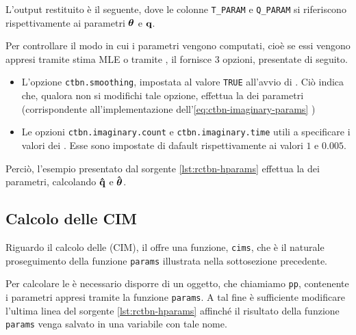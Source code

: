 L'output restituito è il seguente, dove le colonne \lstinline$T_PARAM$ e \lstinline$Q_PARAM$ si riferiscono rispettivamente ai parametri $\boldsymbol{\textbf{\text{$\theta$}}}$ e $\boldsymbol{\textbf{\text{q}}}$.

\vspace*{8pt}\vspace*{8pt}

Per controllare il modo in cui i parametri vengono computati, cioè se essi vengono appresi tramite stima \acl{MLE} o tramite , il \pacchettor{} fornisce $3$ opzioni, presentate di seguito.
\begin{itemize}
	\item L'opzione \lstinline$ctbn.smoothing$, impostata al valore \lstinline[language=rstats]{TRUE} all'avvio di \rctbn{}. Ciò indica che, qualora non si modifichi tale opzione, \rctbn{} effettua la \emph{} dei parametri (corrispondente all'implementazione dell'\autoref{eq:ctbn-imaginary-params} )
	\item Le opzioni \lstinline$ctbn.imaginary.count$  e \lstinline$ctbn.imaginary.time$ utili a specificare i valori dei \emph{}. Esse sono impostate di dafault rispettivamente ai valori $1$ e $0.005$.
\end{itemize}
Perciò, l'esempio presentato dal sorgente \ref{lst:rctbn-hparams} effettua la \emph{} dei parametri, calcolando $\boldsymbol{\hat{\textbf{q}}}$ e $\greekhat{\theta}$.

\cleardoublepage
\subsection{Calcolo delle CIM}
Riguardo il calcolo delle \im{} \cond{} (\acs{CIM}), il \pacchettor{} offre una funzione, \lstinline[language=rstats]{cims}, che è il naturale proseguimento della funzione \lstinline[language=rstats]{params} illustrata nella sottosezione precedente.

Per calcolare le \im{} \cond{} è necessario disporre di un oggetto, che chiamiamo \lstinline$pp$, contenente i parametri appresi tramite la funzione \lstinline[language=rstats]{params}. A tal fine è sufficiente modificare l'ultima linea del sorgente \ref{lst:rctbn-hparams} affinché il risultato della funzione \lstinline[language=rstats]{params} venga salvato in una variabile con tale nome.

